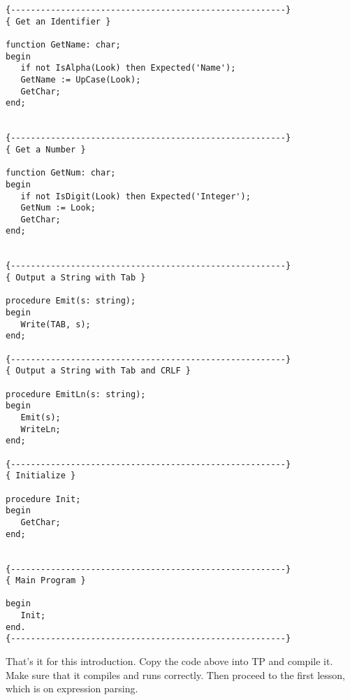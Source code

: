 \begin{verbatim}
{-------------------------------------------------------}
{ Get an Identifier }

function GetName: char;
begin
   if not IsAlpha(Look) then Expected('Name');
   GetName := UpCase(Look);
   GetChar;
end;


{-------------------------------------------------------}
{ Get a Number }

function GetNum: char;
begin
   if not IsDigit(Look) then Expected('Integer');
   GetNum := Look;
   GetChar;
end;


{-------------------------------------------------------}
{ Output a String with Tab }

procedure Emit(s: string);
begin
   Write(TAB, s);
end;

{-------------------------------------------------------}
{ Output a String with Tab and CRLF }

procedure EmitLn(s: string);
begin
   Emit(s);
   WriteLn;
end;

{-------------------------------------------------------}
{ Initialize }

procedure Init;
begin
   GetChar;
end;


{-------------------------------------------------------}
{ Main Program }

begin
   Init;
end.
{-------------------------------------------------------}

\end{verbatim}

That's it for this introduction.  Copy the code above into TP and
compile it.  Make sure that it compiles and runs  correctly. Then
proceed to the first lesson, which is on expression parsing.




